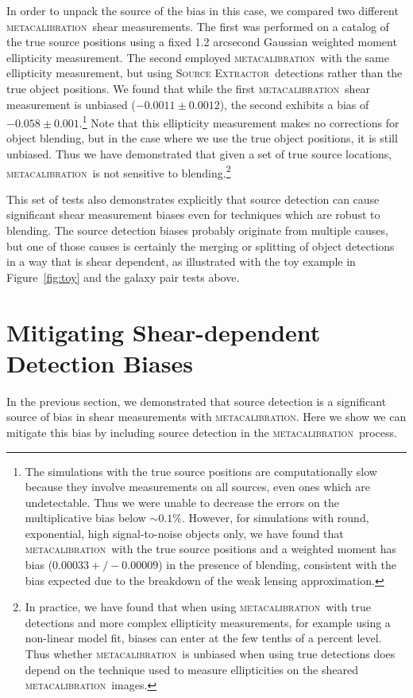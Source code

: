 \documentclass[iop, appendixfloats, numberedappendix, apj]{emulateapj}
\newcommand{\mcal}{\textsc{metacalibration}}
\newcommand{\sx}{\textsc{Source Extractor}}
\begin{document}
In order to unpack the source of the bias in this case, we compared two
different \mcal\ shear measurements. The first was performed on a catalog of the true
source positions using a fixed 1.2 arcsecond Gaussian weighted moment
ellipticity measurement. The second employed \mcal\ with the same ellipticity
measurement, but using \sx\ detections rather than the true object positions. We
found that while the first \mcal\ shear measurement is unbiased
($-0.0011\pm0.0012$), the second exhibits a bias of
$-0.058\pm0.001$.\footnote{The simulations with the true source positions are
computationally slow because they involve measurements on all sources, even
ones which are undetectable. Thus we were unable to decrease the errors on the
multiplicative bias below $\sim0.1\%$. However, for simulations with round,
exponential, high signal-to-noise objects only, we have found that \mcal\ with
the true source positions and a weighted moment has bias ($0.00033 +/-
0.00009$) in the presence of blending, consistent with the bias expected due to
the breakdown of the weak lensing approximation.} Note that this ellipticity
measurement makes no corrections for object blending, but in the case where we
use the true object positions, it is still unbiased. Thus we have demonstrated
that given a set of true source locations, \mcal\ is not sensitive to
blending.\footnote{In practice, we have found that when using \mcal\ with true
detections and more complex ellipticity measurements, for example using a
non-linear model fit, biases can enter at the few tenths of a percent level.
Thus whether \mcal\ is unbiased when using true detections does depend on the
technique used to measure ellipticities on the sheared \mcal\ images.}

This set of tests also demonstrates explicitly that source detection can cause
significant shear measurement biases even for techniques which are robust to
blending. The source detection biases probably originate from multiple causes,
but one of those causes is certainly the merging or splitting of object detections
in a way that is shear dependent, as illustrated with the toy example in
Figure~\ref{fig:toy} and the galaxy pair tests above.

\section{Mitigating Shear-dependent Detection Biases} \label{sec:mitigate}

In the previous section, we demonstrated that source detection is a significant
source of bias in shear measurements with \mcal. Here we show we can
mitigate this bias by including source detection in the
\mcal\ process.
\end{document}
